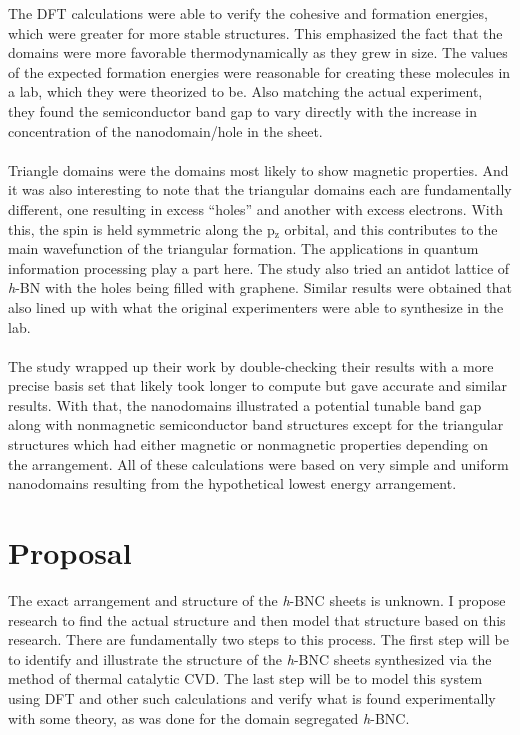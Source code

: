 \documentclass[11pt]{article}
\newcommand{\sub}[1]{\ensuremath{_{\textrm{#1}}}}
\begin{document}
\begin{multicols}{2}
The DFT calculations were able to verify the cohesive and formation energies, which were greater for more stable structures. This emphasized the fact that the domains were more favorable thermodynamically as they grew in size. The values of the expected formation energies were reasonable for creating these molecules in a lab, which they were theorized to be. Also matching the actual experiment, they found the semiconductor band gap to vary directly with the increase in concentration of the nanodomain/hole in the sheet. \\ \\

Triangle domains were the domains most likely to show magnetic properties. And it was also interesting to note that the triangular domains each are fundamentally different, one resulting in excess ``holes'' and another with excess electrons. With this, the spin is held symmetric along the p\sub{z} orbital, and this contributes to the main wavefunction of the triangular formation. The applications in quantum information processing play a part here.\cite{main} The study also tried an antidot lattice of \textit{h}-BN with the holes being filled with graphene. Similar results were obtained that also lined up with what the original experimenters were able to synthesize in the lab.\cite{main,synth} \\ \\

The study wrapped up their work by double-checking their results with a more precise basis set that likely took longer to compute but gave accurate and similar results.\cite{main} With that, the nanodomains illustrated a potential tunable band gap along with nonmagnetic semiconductor band structures except for the triangular structures which had either magnetic or nonmagnetic properties depending on the arrangement. All of these calculations were based on very simple and uniform nanodomains resulting from the hypothetical lowest energy arrangement.



\section{\textbf{Proposal}}
The exact arrangement and structure of the \textit{h}-BNC sheets is unknown. I propose research to find the actual structure and then model that structure based on this research. There are fundamentally two steps to this process. The first step will be to identify and illustrate the structure of the \textit{h}-BNC sheets synthesized via the method of thermal catalytic CVD.\cite{synth} The last step will be to model this system using DFT and other such calculations and verify what is found experimentally with some theory, as was done for the domain segregated \textit{h}-BNC.\cite{main}


\end{multicols}
\end{document}
